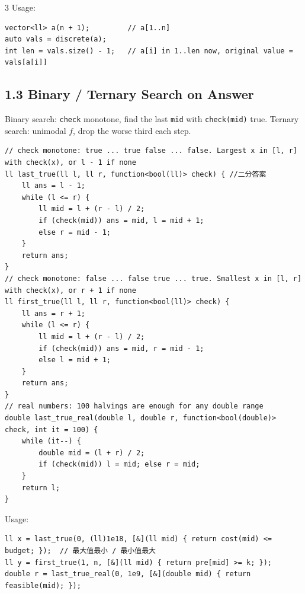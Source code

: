 \documentclass[8pt]{extarticle}
\begin{document}
\begin{multicols*}{3}
Usage:

\begin{lstlisting}
vector<ll> a(n + 1);         // a[1..n]
auto vals = discrete(a);
int len = vals.size() - 1;   // a[i] in 1..len now, original value = vals[a[i]]
\end{lstlisting}

\subsection*{1.3 Binary / Ternary Search on Answer}

Binary search: \texttt{check} monotone, find the last \texttt{mid} with \texttt{check(mid)} true. Ternary search: unimodal $f$, drop the worse third each step.

\begin{lstlisting}
// check monotone: true ... true false ... false. Largest x in [l, r] with check(x), or l - 1 if none
ll last_true(ll l, ll r, function<bool(ll)> check) { //二分答案
    ll ans = l - 1;
    while (l <= r) {
        ll mid = l + (r - l) / 2;
        if (check(mid)) ans = mid, l = mid + 1;
        else r = mid - 1;
    }
    return ans;
}
// check monotone: false ... false true ... true. Smallest x in [l, r] with check(x), or r + 1 if none
ll first_true(ll l, ll r, function<bool(ll)> check) {
    ll ans = r + 1;
    while (l <= r) {
        ll mid = l + (r - l) / 2;
        if (check(mid)) ans = mid, r = mid - 1;
        else l = mid + 1;
    }
    return ans;
}
// real numbers: 100 halvings are enough for any double range
double last_true_real(double l, double r, function<bool(double)> check, int it = 100) {
    while (it--) {
        double mid = (l + r) / 2;
        if (check(mid)) l = mid; else r = mid;
    }
    return l;
}
\end{lstlisting}

Usage:

\begin{lstlisting}
ll x = last_true(0, (ll)1e18, [&](ll mid) { return cost(mid) <= budget; });  // 最大值最小 / 最小值最大
ll y = first_true(1, n, [&](ll mid) { return pre[mid] >= k; });
double r = last_true_real(0, 1e9, [&](double mid) { return feasible(mid); });
\end{lstlisting}


\end{multicols*}
\end{document}
